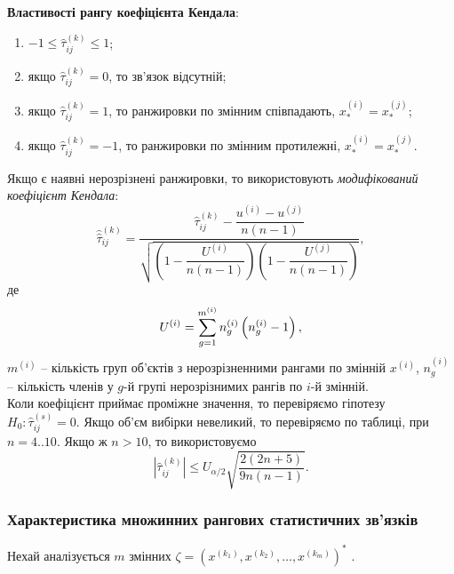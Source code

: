 \textbf{Властивості рангу коефіцієнта Кендала}:
\begin{enumerate}
	\item $-1 \le \widehat{\tau}_{ij}^{(k)} \le 1$;
	\item якщо $\widehat{\tau}_{ij}^{(k)} = 0$, то зв'язок відсутній;
	\item якщо $\widehat{\tau}_{ij}^{(k)} = 1$, то ранжировки по змінним співпадають, $x_*^{(i)} =x_*^{(j)}$;
	\item якщо $\widehat{\tau}_{ij}^{(k)} = -1$, то ранжировки по змінним протилежні, $x_*^{(i)} =x_*^{(j)}$.
\end{enumerate}
Якщо є наявні нерозрізнені ранжировки, то використовують \textit{модифікований коефіцієнт Кендала}: \[ \widehat{\widehat{\tau}}_{ij}^{(k)}  = \dfrac{\widehat{\tau}_{ij}^{(k)} - \dfrac{u^{(i)}-u^{(j)}}{n(n-1)}}{\sqrt{\left(1-\dfrac{U^{(i)}}{n(n-1)}\right)\left(1-\dfrac{U^{(j)}}{n(n-1)}\right)}}, \] де \[ U^{(i)} = \displaystyle\sum\limits_{g=1}^{m^{(i)}} n_g^{(i)} \left( n_g^{(i)} -1 \right), \] $m^{(i)}$ -- кількість груп об'єктів з нерозрізненними рангами по змінній $x^{(i)}$, $n_g^{(i)}$ -- кількість членів у $g$-й групі нерозрізнимих рангів по $i$-й змінній. \\

Коли коефіцієнт приймає проміжне значення, то перевіряємо гіпотезу $H_0: \widehat{\tau}_{ij}^{(s)} = 0$. Якщо об'єм вибірки невеликий, то перевіряємо по таблиці, при $n = 4..10$. Якщо ж $n > 10$, то використовуємо \[\left|\widehat{\tau}_{ij}^{(k)}\right|\le U_{\alpha/2} \sqrt{\dfrac{2(2n+5)}{9n(n-1)}}. \]
\subsubsection{Характеристика множинних рангових статистичних зв'язків}
Нехай аналізується $m$ змінних $\zeta = \left(x^{(k_1)}, x^{(k_2)}, \ldots, x^{(k_m)}\right)^*$ . \\

